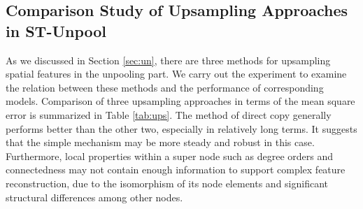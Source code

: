\documentclass[sigconf,screen]{acmart}
\begin{document}
\begin{table}
\centering
\caption{\label{tab:ablation}Comparison of ST-UNet variants with or without ST-Pool \& ST-Unpool operations in terms of prediction accuracy on PeMS-M.}
\end{table}

\subsection{\label{sec:up}Comparison Study of Upsampling Approaches in ST-Unpool}
As we discussed in Section \ref{sec:un}, there are three methods for upsampling spatial features in the unpooling part. We carry out the experiment to examine the relation between these methods and the performance of corresponding models. Comparison of three upsampling approaches in terms of the mean square error is summarized in Table \ref{tab:ups}. The method of direct copy generally performs better than the other two, especially in relatively long terms. It suggests that the simple mechanism may be more steady and robust in this case. Furthermore, local properties within a super node such as degree orders and connectedness may not contain enough information to support complex feature reconstruction, due to the isomorphism of its node elements and significant structural differences among other nodes.
\end{document}
